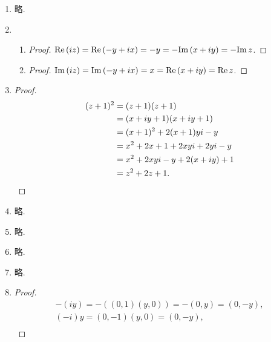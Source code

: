 % 
\begin{enumerate}[(1)]
    \item %
        略.
    \item %
        \begin{enumerate}
            \item %
                \begin{proof}
                    $\mathrm{Re}\,(iz) = \mathrm{Re}\,(-y+ix) = -y = -\mathrm{Im}\,(x+iy) = -\mathrm{Im}\,{z}$.
                \end{proof}
            \item %
                \begin{proof}
                    $\mathrm{Im}\,(iz) = \mathrm{Im}\,(-y+ix) = x = \mathrm{Re}\,(x+iy) = \mathrm{Re}\,{z}$.
                \end{proof}
        \end{enumerate}
    \item %
        \begin{proof}
            \begin{align*}
                (z+1)^2 &= (z+1)(z+1) \\
                &= (x+iy+1)(x+iy+1) \\
                &= (x+1)^2 + 2(x+1)yi - y \\
                &= x^2+2x+1 + 2xyi+2yi - y \\
                &= x^2+2xyi-y + 2(x+iy) + 1 \\
                &= z^2 + 2z + 1. \qedhere
            \end{align*}
        \end{proof}
    \item %
        略.
    \item %
        略.
    \item %
        略.
    \item %
        略.
    \item %
        \begin{proof}
            \begin{gather*}
                -(iy) = -((0,1)(y,0)) = -(0,y) = (0,-y), \\
                (-i)y = (0,-1)(y,0) = (0,-y), \\

\end{gather*}
\end{proof}
\end{enumerate}
